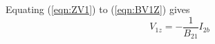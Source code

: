 \documentclass[a4paper, 12pt]{article}
\newcommand{\refeqn}[1]{\mbox{(\ref{eqn:#1})}}
\begin{document}
Equating \refeqn{ZV1} to \refeqn{BV1Z} gives
%
\begin{equation}
  V_{1z} = -\frac{1}{B_{21}} I_{2b}
\end{equation}









\end{document}
